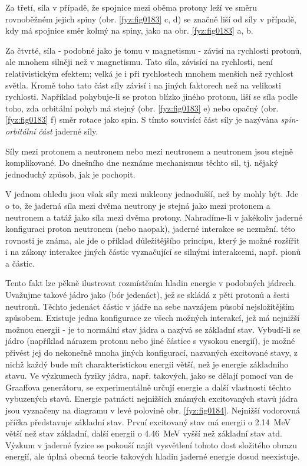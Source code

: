     Za třetí, síla v případě, že spojnice mezi oběma protony leží ve směru rovnoběžném jejich spiny
    (obr. \ref{fyz:fig0183} c, d) se značně liší od síly v případě, kdy má spojnice směr kolmý na
    spiny, jako na obr. \ref{fyz:fig0183} a, b.

    Za čtvrté, síla - podobné jako je tomu v magnetismu - závisí na rychlosti protonů, ale mnohem
    silněji než v magnetismu. Tato síla, závisící na rychlosti, není relativistickým efektem; velká
    je i při rychlostech mnohem menších než rychlost světla. Kromě toho tato část síly závisí i na
    jiných faktorech než na velikosti rychlosti. Například pohybuje-li se proton blízko jiného
    protonu, liší se síla podle toho, zda orbitální pohyb má stejný (obr. \ref{fyz:fig0183} e) nebo
    opačný (obr. \ref{fyz:fig0183} f) směr rotace jako spin. S tímto souvisící část síly je nazývána
    \emph{spin-orbitální část} jaderné síly.

    Síly mezi protonem a neutronem nebo mezi neutronem a neutronem jsou stejně komplikované. Do
    dnešního dne neznáme mechanismus těchto sil, tj. nějaký jednoduchý způsob, jak je pochopit.

    V jednom ohledu jsou však síly mezi nukleony jednodušší, než by mohly být. Jde o to, že jaderná
    síla mezi dvěma neutrony je stejná jako mezi protonem a neutronem a tatáž jako síla mezi dvěma
    protony. Nahradíme-li v jakékoliv jaderné konfiguraci proton neutronem (nebo naopak), jaderné
    interakce se nezmění.  této rovnosti je známa, ale jde o příklad
    důležitějšího principu, který je možné rozšířit i na zákony interakce jiných částic vyznačující
    se silnými interakcemi, např. pionů a  částic.

    Tento fakt lze pěkně ilustrovat rozmístěním hladin energie v podobných jádrech. Uvažujme takové
    jádro jako  (bór jedenáct), jež se skládá z pěti protonů a šesti neutronů. Těchto
    jedenáct částic v jádře na sebe navzájem působí nejsložitějším způsobem. Existuje jedna
    konfigurace ze všech možných interakcí, jež má nejnižší možnou energii - je to normální stav
    jádra a nazývá se základní stav. Vybudí-li se jádro (například nárazem protonu nebo jiné částice
    s vysokou energií), je možné přivést jej do nekonečně mnoha jiných konfigurací, nazvaných
    excitované stavy, z nichž každý bude mít charakteristickou energii větší, než je energie
    základního stavu. Ve výzkumech fyziky jádra, např. takových, jako se dělají pomocí van de
    Graaffova generátoru, se experimentálně určují energie a další vlastnosti těchto vybuzených
    stavů. Energie patnácti nejnižších známých excitovaných stavů jádra  jsou vyznačeny na
    diagramu v levé polovině obr. \ref{fyz:fig0184}. Nejnižší vodorovná příčka představuje základní
    stav. První excitovaný stav má energii o \SI{2.14}{\mega\electronvolt} větší než stav základní,
    další energii o \SI{4.46}{\mega\electronvolt} vyšší než základní stav atd. Výzkum v jaderné
    fyzice se pokouší najít vysvětlení tohoto dost složitého obrazu energií, ale úplná obecná teorie
    takových hladin jaderné energie dosud neexistuje.
    

